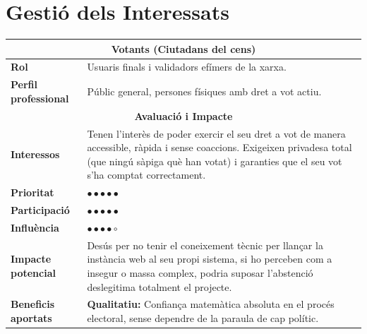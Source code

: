 \section{Gestió dels Interessats}

\begin{table}[H]
\centering
\renewcommand{\arraystretch}{1.5}
\begin{tabularx}{\textwidth}{|l|X|}
\hline
\multicolumn{2}{|c|}{\textbf{Votants (Ciutadans del cens)}} \\ \hline
\textbf{Rol} & Usuaris finals i validadors efímers de la xarxa. \\ \hline
\textbf{Perfil professional} & Públic general, persones físiques amb dret a vot actiu. \\ \hline
\multicolumn{2}{|c|}{\textbf{Avaluació i Impacte}} \\ \hline
\textbf{Interessos} & Tenen l'interès de poder exercir el seu dret a vot de manera accessible, ràpida i sense coaccions. Exigeixen privadesa total (que ningú sàpiga què han votat) i garanties que el seu vot s'ha comptat correctament. \\ \hline
\textbf{Prioritat} & \(\bullet \bullet \bullet \bullet \bullet\) \\ \hline
\textbf{Participació} & \(\bullet \bullet \bullet \bullet \bullet\) \\ \hline
\textbf{Influència} & \(\bullet \bullet \bullet \bullet \circ\) \\ \hline
\textbf{Impacte potencial} & Desús per no tenir el coneixement tècnic per llançar la instància web al seu propi sistema, si ho perceben com a insegur o massa complex, podria suposar l'abstenció deslegitima totalment el projecte. \\ \hline
\textbf{Beneficis aportats} & \textbf{Qualitatiu:} Confiança matemàtica absoluta en el procés electoral, sense dependre de la paraula de cap polític. \\ \hline
\end{tabularx}
\end{table}


\vspace{0.5cm}

